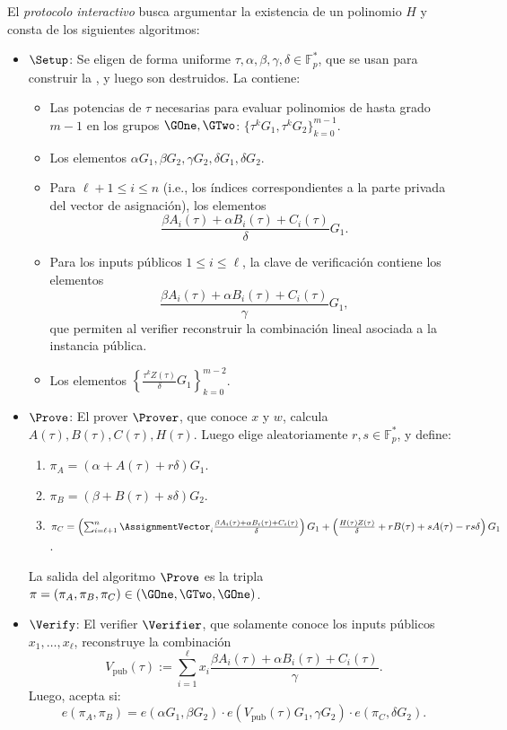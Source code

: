\begin{definition}
	El \emph{protocolo interactivo \Groth} busca argumentar la existencia de un polinomio $H$ y consta de los siguientes algoritmos:
	
	\begin{itemize}
		\item $\Setup$: Se eligen de forma uniforme $\tau, \alpha, \beta, \gamma, \delta \in \mathbb{F}^*_p$, que se usan para construir la \SRS, y luego son destruidos. La \SRS contiene:
		\begin{itemize}[noitemsep]
			\item Las potencias de $\tau$ necesarias para evaluar polinomios de hasta grado $m - 1$ en los grupos $\GOne, \GTwo$: $\{\tau^k G_1, \tau^k G_2\}_{k=0}^{m-1}$.
			\item Los elementos $\alpha G_1, \beta G_2, \gamma G_2, \delta G_1, \delta G_2$.
			\item Para $\ell + 1 \leq i \leq n$ (i.e., los índices correspondientes a la parte privada del vector de asignación), los elementos
			$$\frac{\beta A_i(\tau) + \alpha B_i(\tau) + C_i(\tau)}{\delta} G_1.$$
			\item Para los inputs públicos $1 \leq i \leq \ell$, la clave de verificación contiene los elementos
			$$\frac{\beta A_i(\tau) + \alpha B_i(\tau) + C_i(\tau)}{\gamma} G_1,$$
			que permiten al verifier reconstruir la combinación lineal asociada a la instancia pública.
			\item Los elementos $\left\{\frac{\tau^k Z(\tau)}{\delta} G_1\right\}_{k=0}^{m-2}$.
		\end{itemize}
		\item $\Prove$: El prover $\Prover$, que conoce $x$ y $w$, calcula $A(\tau), B(\tau), C(\tau), H(\tau)$. Luego elige aleatoriamente $r, s \in \mathbb{F}^*_p$, y define:
		\begin{enumerate}
			\item $\pi_A = \left(\alpha + A(\tau) + r\delta\right) G_1$.
			\item $\pi_B = \left(\beta + B(\tau) + s\delta\right) G_2$.
			\item $\pi_C = \left(\sum_{i=\ell+1}^{n} \AssignmentVector_i \frac{\beta A_i(\tau) + \alpha B_i(\tau) + C_i(\tau)}{\delta}\right)G_1 + \left(\frac{H(\tau)Z(\tau)}{\delta} + rB(\tau) + sA(\tau) - rs\delta\right)G_1 $.
		\end{enumerate}
		La salida del algoritmo $\Prove$ es la tripla $\pi = (\pi_A, \pi_B, \pi_C) \in (\GOne, \GTwo, \GOne)$.
			\item $\Verify$: El verifier $\Verifier$, que solamente conoce los inputs públicos $x_1,\ldots,x_\ell$, reconstruye la combinación
			$$V_{\mathrm{pub}}(\tau) := \sum_{i=1}^{\ell} x_i \frac{\beta A_i(\tau) + \alpha B_i(\tau) + C_i(\tau)}{\gamma}.$$
			Luego, acepta si:
			$$e(\pi_A, \pi_B) = e(\alpha G_1, \beta G_2) \cdot e\!\left(V_{\mathrm{pub}}(\tau) G_1, \gamma G_2\right) \cdot e(\pi_C, \delta G_2).$$
		\end{itemize}
	\end{definition}

